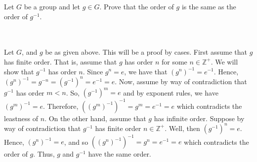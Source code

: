 Let $G$ be a group and let $g\in G$. Prove that the order of $g$ is the same as the order of
$g^{-1}$.\\\\

\begin{solution}\renewcommand{\qedsymbol}{}\ \\
    Let $G$, and $g$ be as given above. This will be a proof by cases. First assume that $g$ has finite
    order. That is, assume that $g$ has order $n$ for some $n\in\mathbb{Z}^+$. We will show that
    $g^{-1}$ has order $n$. Since $g^n=e$, we have that $(g^n)^{-1}=e^{-1}$. Hence,
    $(g^n)^{-1}=g^{-n}=(g^{-1})^n=e^{-1}=e$. Now, assume by way of contradiction that $g^{-1}$ has order
    $m<n$. So, $(g^{-1})^m=e$ and by exponent rules, we have $(g^m)^{-1}=e$. Therefore,
    $((g^m)^{-1})^{-1}=g^m=e^{-1}=e$ which contradicts the leastness of $n$. On the other hand, assume
    that $g$ has infinite order. Suppose by way of contradiction that $g^{-1}$ has finite order
    $n\in\mathbb{Z}^+$. Well, then $(g^{-1})^n=e$. Hence, $(g^n)^{-1}=e$, and so
    $((g^n)^{-1})^{-1}=g^n=e^{-1}=e$ which contradicts the order of $g$. Thus, $g$ and $g^{-1}$ have the
    same order.

\end{solution}